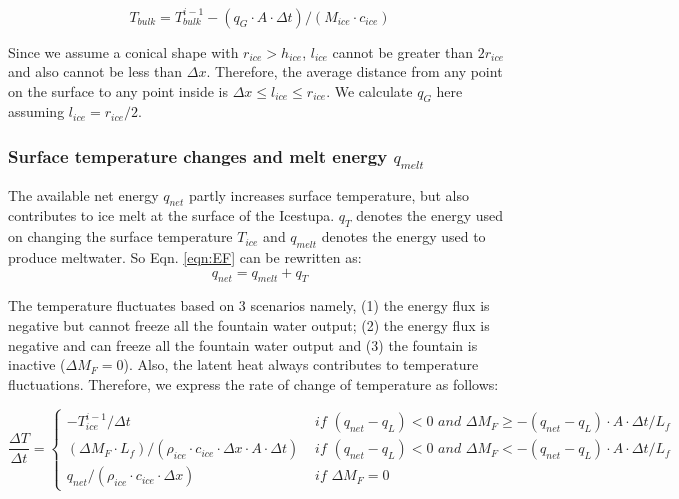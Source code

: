 \documentclass[utf8]{frontiersSCNS} %
\begin{document}
\begin{equation} T_{bulk} = T_{bulk}^{i-1} - (q_{G} \cdot A \cdot \Delta t)/(M_{ice} \cdot c_{ice}) \end{equation}

Since we assume a conical shape with $r_{ice} > h_{ice}$, $l_{ice}$ cannot be greater than $2r_{ice}$ and also cannot
be less than $\Delta x$. Therefore, the average distance from any point on the surface to any point inside is $\Delta
x \leq l_{ice} \leq r_{ice}$. We calculate $q_{G}$ here assuming $l_{ice} = r_{ice}/2$.


\subsubsection{Surface temperature changes and melt energy $q_{melt}$}
The available net energy $q_{net}$ partly increases surface temperature, but also contributes to ice melt at the
surface of the Icestupa. $q_{T}$ denotes the energy used on changing the surface temperature $T_{ice}$ and $q_{melt}$
denotes the energy used to produce meltwater. So Eqn. \ref{eqn:EF} can be rewritten as: \begin{equation} q_{net} =
q_{melt} + q_{T} \end{equation}

The temperature fluctuates based on 3 scenarios namely, (1) the energy flux is negative but cannot freeze all the
fountain water output; (2) the energy flux is negative and can freeze all the fountain water output and (3) the
fountain is inactive ($\Delta M_{F}=0$). Also, the latent heat always contributes to temperature fluctuations.
Therefore, we express the rate of change of temperature as follows:

\begin{equation} \frac{\Delta T}{\Delta t} = \left\{ \begin{array}{ll} -T_{ice}^{i-1}/\Delta t & \textit{ if }
    (q_{net}-q_{L}) < 0 \textit{ and } \Delta M_{F} \geq -(q_{net}-q_{L})\cdot A \cdot \Delta t/L_f  \\ (\Delta M_{F}
    \cdot L_f )/(\rho_{ice} \cdot c_{ice} \cdot  \Delta x \cdot A \cdot \Delta t) & \textit{ if } (q_{net}-q_{L}) < 0
    \textit{ and } \Delta M_{F} < -(q_{net}-q_{L})\cdot A \cdot \Delta t/L_f  \\ q_{net}/ (\rho_{ice}\cdot c_{ice}
    \cdot \Delta x)& \textit{ if } \Delta M_{F} = 0
         
    \end{array} \right.  \label{eqn:T} \end{equation}
\end{document}
